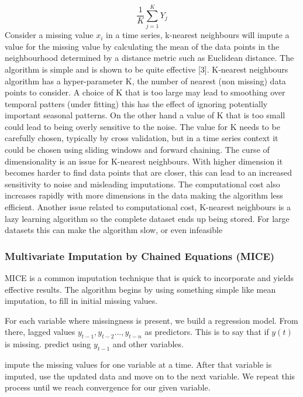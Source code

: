 \documentclass[
]{report}
\begin{document}
\[\frac{1}{K}\sum_{j=1}^K Y_j\] Consider a missing value \(x_i\) in a
time series, k-nearest neighbours will impute a value for the missing
value by calculating the mean of the data points in the neighbourhood
determined by a distance metric such as Euclidean distance. The
algorithm is simple and is shown to be quite effective {[}3{]}.
K-nearest neighbours algorithm has a hyper-parameter K, the number of
nearest (non missing) data points to consider. A choice of K that is too
large may lead to smoothing over temporal patters (under fitting) this
has the effect of ignoring potentially important seasonal patterns. On
the other hand a value of K that is too small could lead to being overly
sensitive to the noise. The value for K needs to be carefully chosen,
typically by cross validation, but in a time series context it could be
chosen using sliding windows and forward chaining. The curse of
dimensionality is an issue for K-nearest neighbours. With higher
dimension it becomes harder to find data points that are closer, this
can lead to an increased sensitivity to noise and misleading
imputations. The computational cost also increases rapidly with more
dimensions in the data making the algorithm less efficient. Another
issue related to computational cost, K-nearest neighbours is a lazy
learning algorithm so the complete dataset ends up being stored. For
large datasets this can make the algorithm slow, or even infeasible


\hypertarget{multivariate-imputation-by-chained-equations-mice}{%
\subsubsection{Multivariate Imputation by Chained Equations
(MICE)}\label{multivariate-imputation-by-chained-equations-mice}}

MICE is a common imputation technique that is quick to incorporate and
yields effective results. The algorithm begins by using something simple
like mean imputation, to fill in initial missing values.

For each variable where missingness is present, we build a regression
model. From there, lagged values \({y_{t-1}, y_{t-2}...,y_{t-n}}\) as
predictors. This is to say that if \({y(t)}\) is missing. predict using
\(y_{t-1}\) and other variables.

impute the missing values for one variable at a time. After that
variable is imputed, use the updated data and move on to the next
variable. We repeat this process until we reach convergence for our
given variable.
\end{document}
